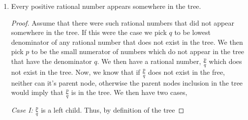 \documentclass[11pt, leqno]{article}
\begin{document}
\begin{enumerate}
\begin{enumerate}[label=(\alph*)]
		\begin{proof}
		We proceed by induction. First, we note that $\frac{1}{1}$ is in lowest possible terms, as $(1,1) = 1$. Now, we take our induction hypothesis to be that $\frac{i}{j}$ is in lowest possible terms, and attempt to show that both $\frac{i}{i+j}$ and $\frac{i+j}{j}$ are also in lowest possible terms. First, we know that $(i, j) = 1$, this means that given some $x,y \in \mathbb{R}$
		\begin{align*}
			ix + jy &= 1 \\
			ix + jy + (xj - xj) &= 1 \\
			ix + xj + jy -xj &= 1 \\
			(i + j)x + j(y - x) &= 1
		\end{align*}
		Therefore $i + j$ and $j$ are coprime, meaning that $(i + j, j) = 0$. Hence, $\frac{i + j}{i}$ is in lowest terms. Additionally we can compute
		\begin{align*}
			ix + jy &= 1 \\
			ix + jy + (yi - yi) &= 1 \\
			ix - yj + jy + yi &= 1 \\
			i(x - y) + (i + j) &= 1
		\end{align*}
		Once again, we see similarly that $i$ and $i + j$ are coprime and that $(i, i + j) = 1$. Meaning also that $\frac{i}{i + j}$ is in lowest terms.
		
		By induction we can therefore conclude that every element of the tree will be in lowest terms.
 		\end{proof}
		
		\item Every positive rational number appears somewhere in the tree.
		
		\begin{proof}
		Assume that there were such rational numbers that did not appear somewhere in the tree. If this were the case we pick $q$ to be lowest denominator of any rational number that does not exist in the tree. We then pick $p$ to be the small numerator of numbers which do not appear in the tree that have the denominator $q$. We then have a rational number, $\frac{p}{q}$ which does not exist in the tree. Now, we know that if $\frac{p}{q}$ does not exist in the free, neither can it's parent node, otherwise the parent nodes inclusion in the tree would imply that $\frac{p}{q}$ is in the tree. We then have two cases,
		
		\textit{Case I: } $\frac{p}{q}$ is a left child. Thus, by definition of the tree
		

\end{proof}
\end{enumerate}
\end{enumerate}
\end{document}
